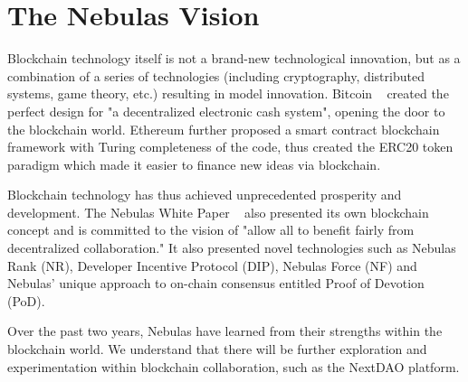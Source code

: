 \section {The Nebulas Vision}
Blockchain technology itself is not a brand-new technological innovation, but as a combination of a series of technologies (including cryptography, distributed systems, game theory, etc.) resulting in model innovation. Bitcoin ~\cite{Nakamoto2008} created the perfect design for "a decentralized electronic cash system", opening the door to the blockchain world. Ethereum further proposed a smart contract blockchain framework with Turing completeness of the code, thus created the ERC20 token paradigm which made it easier to finance new ideas via blockchain.

Blockchain technology has thus achieved unprecedented prosperity and development. The Nebulas White Paper ~\cite{TechWhitepaper} also presented its own blockchain concept and is committed to the vision of "allow all to benefit fairly from decentralized collaboration." It also presented novel technologies such as Nebulas Rank (NR), Developer Incentive Protocol (DIP), Nebulas Force (NF) and Nebulas' unique approach to on-chain consensus entitled Proof of Devotion (PoD).

Over the past two years, Nebulas have learned from their strengths within the blockchain world. We understand that there will be further exploration and experimentation within blockchain collaboration, such as the NextDAO platform.
